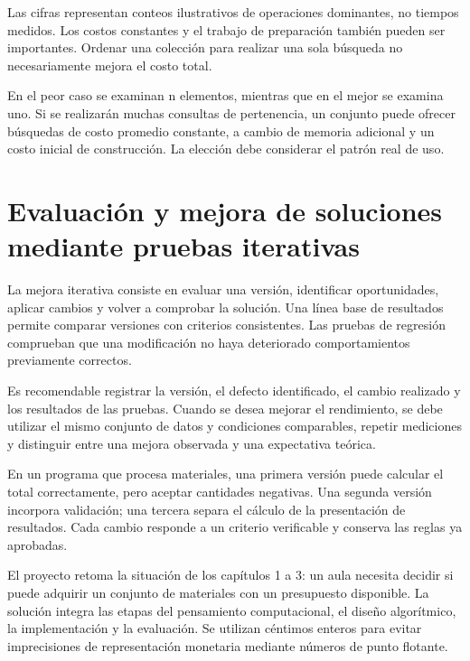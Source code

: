 

Las cifras representan conteos ilustrativos de operaciones dominantes, no tiempos medidos. Los costos constantes y el trabajo de preparación también pueden ser importantes. Ordenar una colección para realizar una sola búsqueda no necesariamente mejora el costo total.


En el peor caso se examinan n elementos, mientras que en el mejor se examina uno. Si se realizarán muchas consultas de pertenencia, un conjunto puede ofrecer búsquedas de costo promedio constante, a cambio de memoria adicional y un costo inicial de construcción. La elección debe considerar el patrón real de uso.

\section{Evaluación y mejora de soluciones mediante pruebas iterativas}

La mejora iterativa consiste en evaluar una versión, identificar oportunidades, aplicar cambios y volver a comprobar la solución. Una línea base de resultados permite comparar versiones con criterios consistentes. Las pruebas de regresión comprueban que una modificación no haya deteriorado comportamientos previamente correctos.

Es recomendable registrar la versión, el defecto identificado, el cambio realizado y los resultados de las pruebas. Cuando se desea mejorar el rendimiento, se debe utilizar el mismo conjunto de datos y condiciones comparables, repetir mediciones y distinguir entre una mejora observada y una expectativa teórica.

En un programa que procesa materiales, una primera versión puede calcular el total correctamente, pero aceptar cantidades negativas. Una segunda versión incorpora validación; una tercera separa el cálculo de la presentación de resultados. Cada cambio responde a un criterio verificable y conserva las reglas ya aprobadas.



\label{sec:proyecto-integrador}

El proyecto retoma la situación de los capítulos 1 a 3: un aula necesita decidir si puede adquirir un conjunto de materiales con un presupuesto disponible. La solución integra las etapas del pensamiento computacional, el diseño algorítmico, la implementación y la evaluación. Se utilizan céntimos enteros para evitar imprecisiones de representación monetaria mediante números de punto flotante.

